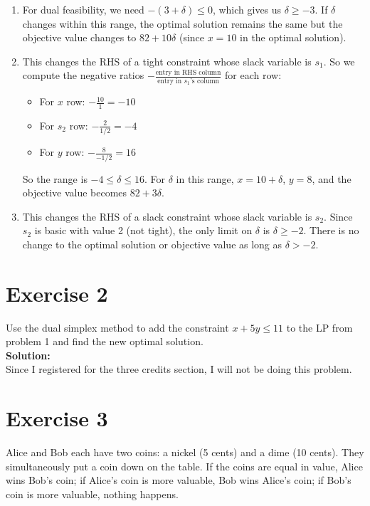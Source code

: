 \documentclass{article}
\begin{document}
\begin{enumerate}[label=(\alph*)]
    \item For dual feasibility, we need $-(3+\delta) \leq 0$, which gives us $\delta \geq -3$. If $\delta$ changes within this range, the optimal solution remains the same but the objective value changes to $82 + 10\delta$ (since $x = 10$ in the optimal solution).

    \item This changes the RHS of a tight constraint whose slack variable is $s_1$. So we compute the negative ratios $-\frac{\text{entry in RHS column}}{\text{entry in $s_1$'s column}}$ for each row:
    \begin{itemize}
        \item For $x$ row: $-\frac{10}{1} = -10$
        \item For $s_2$ row: $-\frac{2}{1/2} = -4$
        \item For $y$ row: $-\frac{8}{-1/2} = 16$
    \end{itemize}

    So the range is $-4 \leq \delta \leq 16$. For $\delta$ in this range, $x = 10 + \delta$, $y = 8$, and the objective value becomes $82 + 3\delta$.

    \item This changes the RHS of a slack constraint whose slack variable is $s_2$. Since $s_2$ is basic with value 2 (not tight), the only limit on $\delta$ is $\delta \geq -2$. There is no change to the optimal solution or objective value as long as $\delta > -2$.
\end{enumerate}

\newpage

\section*{Exercise 2}
Use the dual simplex method to add the constraint $x+5y \leq 11$ to the LP from problem 1 and find the new optimal solution. \\

\textbf{Solution: } \\

Since I registered for the three credits section, I will not be doing this problem.

\newpage

\section*{Exercise 3}
Alice and Bob each have two coins: a nickel (5 cents) and a dime (10 cents). They simultaneously put a coin down on the table. If the coins are equal in value, Alice wins Bob's coin; if Alice's coin is more valuable, Bob wins Alice's coin; if Bob's coin is more valuable, nothing happens. \\
\end{document}
